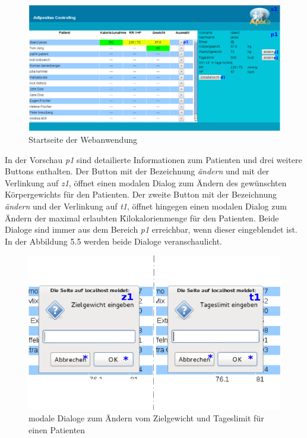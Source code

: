   

\begin{figure}[h]
\centering
  \includegraphics[scale=0.25]{screenshots/kapitel5/startseite_webui_.png}
  \caption{Startseite der Webanwendung}
\end{figure}

In der Vorschau \emph{p1} sind detailierte Informationen zum Patienten und drei weitere 
Buttons enthalten. 
Der Button mit der Bezeichnung \emph{\"andern} und mit der Verlinkung auf \emph{z1}, 
\"offnet einen modalen Dialog zum \"Andern des gew\"unschten K\"orpergewichts 
f\"ur den Patienten.
Der zweite Button mit der Bezeichnung \emph{\"andern} und der Verlinkung auf \emph{t1}, 
\"offnet hingegen einen modalen Dialog zum \"Andern der maximal erlaubten 
\"Kilokalorienmenge f\"ur den Patienten.
Beide Dialoge sind immer aus dem Bereich \emph{p1} erreichbar, wenn dieser eingeblendet ist.
In der Abbildung 5.5 werden beide Dialoge veranschaulicht.\\

\begin{figure}[h]
\centering
  \includegraphics[scale=0.5]{screenshots/kapitel5/modaldialogs_.png}
  \caption{modale Dialoge zum \"Andern vom Zielgewicht und Tageslimit f\"ur einen Patienten}
\end{figure}

